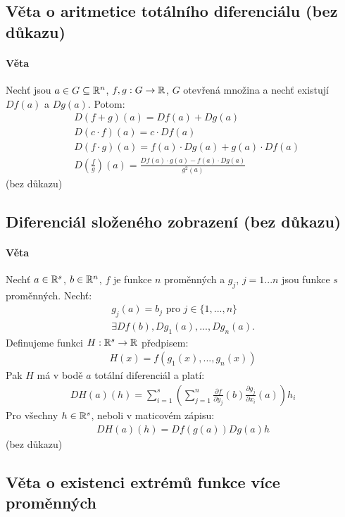 \documentclass[a4paper,10pt]{article}
\begin{document}
\subsection{Věta o aritmetice totálního diferenciálu (bez důkazu)}
\setcounter{equation}{0}
\paragraph{Věta}
Nechť jsou $a \in G \subseteq \mathbb{R}^n$, $f,g: G \to \mathbb{R}$, $G$ otevřená množina
a nechť existují $Df(a)$ a $Dg(a)$. Potom:
\begin{align*}
	&D(f+g)(a) = Df(a) + Dg(a) \\
	&D(c\cdot f)(a) = c \cdot Df(a) \\
	&D(f \cdot g)(a) = f(a) \cdot Dg(a) + g(a) \cdot Df(a) \\
	&D( \frac{f}{g})(a) = \frac{Df(a) \cdot g(a) - f(a) \cdot Dg(a)}{g^2(a)}
\end{align*}
(bez důkazu)

\subsection{Diferenciál složeného zobrazení (bez důkazu)}
\setcounter{equation}{0}
\paragraph{Věta}
Nechť $a \in \mathbb{R}^s$, $b\in \mathbb{R}^n$, $f$ je funkce $n$ proměnných a $g_j$, $j = 1...
n$ jsou funkce $s$ proměnných. Nechť:
\begin{align*}
	g_j (a) = b_j \text{ pro } j \in \{1, ..., n\} \\
	\exists Df(b), Dg_1(a), ..., Dg_n(a).
\end{align*}
Definujeme funkci $H: \mathbb{R}^s \to \mathbb{R}$ předpisem:
\begin{align*}
	H(x) = f(g_1(x), ..., g_n(x))
\end{align*}
Pak $H$ má v bodě $a$ totální diferenciál a platí:
\begin{align*}
	DH(a)(h) = \sum_{i=1}^s \left( \sum_{j=1}^n \frac{\partial f}{\partial
	y_j}(b) \frac{\partial g_j}{\partial x_i}(a) \right) h_i
\end{align*}
Pro všechny $h \in \mathbb{R}^s$, neboli v maticovém zápisu:
\begin{align*}
	DH(a)(h) = Df(g(a))Dg(a)h
\end{align*}
(bez důkazu)


\subsection{Věta o existenci extrémů funkce více proměnných}
\setcounter{equation}{0}
\end{document}
